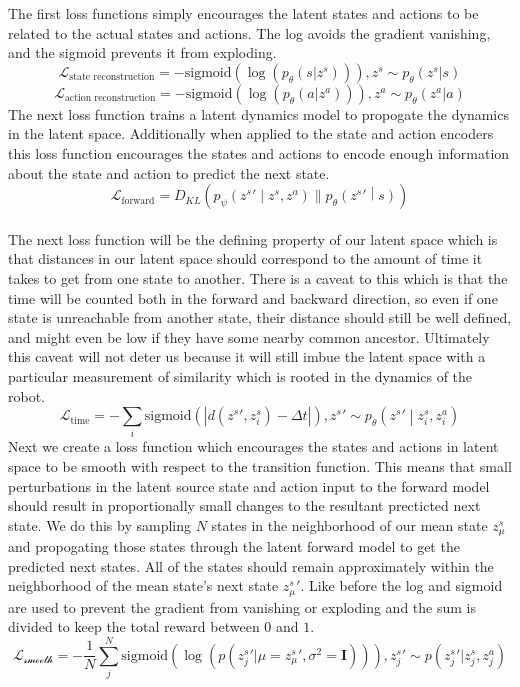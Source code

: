 \documentclass{article}
\begin{document}
The first loss functions simply encourages the latent states and actions to be related to the actual states and actions.
The log avoids the gradient vanishing, and the sigmoid prevents it from exploding.
$$\mathcal{L}_\text{state reconstruction} = -\text{sigmoid}(\log(p_\theta(s|z^s))), z^s \sim p_\theta(z^s | s)$$
$$\mathcal{L}_\text{action reconstruction} = -\text{sigmoid}(\log(p_\theta(a|z^a))), z^a \sim p_\theta(z^a | a)$$
The next loss function trains a latent dynamics model to propogate the dynamics in the latent space.
Additionally when applied to the state and action encoders this loss function encourages the states and actions to encode enough information about the state and action to predict the next state.
$$\mathcal{L}_{\text{forward}} = D_{KL}\left( p_\psi\left({z^s}'\middle|z^s,z^a\right) \parallel p_\theta\left({z^s}'\middle| s\right) \right)$$ \\
The next loss function will be the defining property of our latent space which is that distances in our latent space should correspond to the amount of time it takes to get from one state to another.
There is a caveat to this which is that the time will be counted both in the forward and backward direction, so even if one state is unreachable from another state, their distance should still be well defined, and might even be low if they have some nearby common ancestor.
Ultimately this caveat will not deter us because it will still imbue the latent space with a particular measurement of similarity which is rooted in the dynamics of the robot.
$$\mathcal{L}_\text{time} = -\sum\limits_i \text{sigmoid}(|d({z^s}',z^s_i) - \Delta t|), {z^s}' \sim p_\theta\left({z^s}'\middle|z^s_i,z^a_i\right)$$
Next we create a loss function which encourages the states and actions in latent space to be smooth with respect to the transition function.
This means that small perturbations in the latent source state and action input to the forward model should result in proportionally small changes to the resultant precticted next state.
We do this by sampling $N$ states in the neighborhood of our mean state $z_\mu^s$ and propogating those states through the latent forward model to get the predicted next states.
All of the states should remain approximately within the neighborhood of the mean state's next state ${z_\mu^s}'$.
Like before the log and sigmoid are used to prevent the gradient from vanishing or exploding and the sum is divided to keep the total reward between $0$ and $1$.
$$\mathcal{L_\text{smooth}} = -\frac{1}{N}\sum\limits_j^N \text{sigmoid}(\log(p({z^s_j}'|\mu={z^s_\mu}',\sigma^2=\mathbf{I}))), {z^s_j}' \sim p({z^s_j}'|z^s_j,z^a_j)$$
\end{document}
